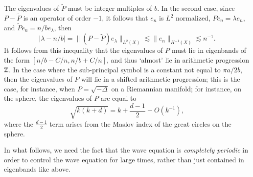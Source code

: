 The eigenvalues of $\tilde{P}$ must be integer multiples of $b$. In the second case, since $P - \tilde{P}$ is an operator of order $-1$, it follows that $e_n$ is $L^2$ normalized, $P e_n = \lambda e_n$, and $\tilde{P} e_n = n / b e_\lambda$, then
%
\[ |\lambda - n / b| = \| (P - \tilde{P}) e_\lambda \|_{L^2(X)} \lesssim \| e_n \|_{H^{-1}(X)} \lesssim n^{-1}. \]
%
It follows from this inequality that the eigenvalues of $P$ must lie in eigenbands of the form $[n/b - C/n, n/b + C/n]$, and thus `almost' lie in arithmetic progression $\operatorname{\mathbb{Z}}$. In the case where the sub-principal symbol is a constant not equal to $\pi a / 2b$, then the eigenvalues of $P$ will lie in a shifted arithmetic progression; this is the case, for instance, when $P = \sqrt{-\Delta}$ on a Riemannian manifold; for instance, on the sphere, the eigenvalues of $P$ are equal to
%
\begin{equation}
  \sqrt{k(k+d)} = k + \frac{d-1}{2} + O(k^{-1}),
\end{equation}
%
where the $\tfrac{d-1}{2}$ term arises from the Maslov index of the great circles on the sphere.

In what follows, we need the fact that the wave equation is \emph{completely periodic} in order to control the wave equation for large times, rather than just contained in eigenbands like above.
